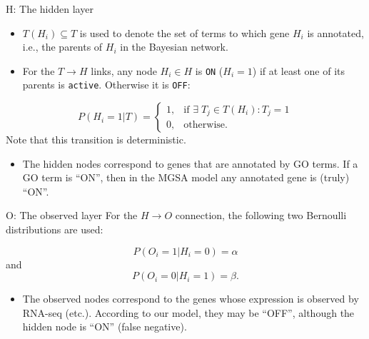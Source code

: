 \documentclass{beamer}
\newcommand{\ifgenehasactiveterm}{\text{if } \exists \; T_j \in T(H_i): T_j=1}
\begin{document}
\begin{frame}{H: The hidden layer}
\begin{itemize}
\item  $T(H_i) \subseteq T$ is used to denote the set of
terms to which gene $H_i$ is annotated, i.e., the parents of $H_i$ in
the Bayesian network. 
\item For
the $T \rightarrow H$ links, any node $H_i \in H$ is \texttt{ON}
($H_i=1$) if at least one of its parents is \texttt{active}. Otherwise it
is \texttt{OFF}:
\end{itemize}




\begin{equation}
P(H_i=1|T) = \begin{cases}1, & \ifgenehasactiveterm \\ 0, &
\text{otherwise.} \end{cases}
\label{eqn:lpd.hidden.given.t}
\end{equation}
Note that this transition is deterministic.

\begin{itemize}
 \item The hidden nodes correspond to genes that are annotated by GO terms. If a GO term is ``ON'', 
then in the MGSA model any annotated gene is (truly) ``ON''.
\end{itemize}



\end{frame}


\begin{frame}{O: The observed layer}
 For the $H \rightarrow O$
connection, the following two Bernoulli distributions are used:

\begin{equation}
P(O_i=1|H_i=0) = \alpha
\label{eq:mgsa-bernoulli-alpha}
\end{equation}
and
\begin{equation}
P(O_i=0|H_i=1) = \beta.
\label{eq:mgsa-bernoulli-beta}
\end{equation}
\begin{itemize}
 \item The observed nodes correspond to the genes whose expression is observed by RNA-seq (etc.). According to our model, they may be ``OFF'', although the hidden node is 
``ON'' (false negative). 
\end{itemize}

 
\end{frame}
\end{document}
